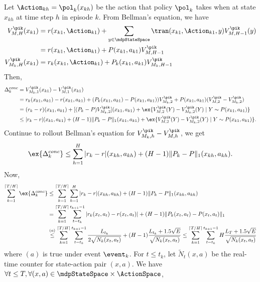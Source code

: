 Let $\Action_{kh}=\pol_{k}(x_{kh})$ be the action that policy $\pol_k$ takes when at state $x_{kh}$ at time step $h$ in episode $k$. From Bellman's equation, we have
\begin{align*}
V^{\pik}_{M,H}(x_{k1})
&= r(x_{k1},\Action_{k1}) +\sum_{y\in\mdpStateSpace}\tran(x_{k1},\Action_{k1},y)V^{\pik}_{M,H-1}(y) \\
&= r(x_{k1},\Action_{k1}) +P(x_{k1},a_{k1})V^{\pik}_{M,H-1} \\
V^{\pik}_{M_k,H}(x_{k1}) &= r_k(x_{k1},\Action_{k1}) +P_k(x_{k1},a_{k1})V^{\pik}_{M_k,H-1}
\end{align*}
Then,
\begin{align*}
\Delta_k^{conc}
    &= V^{\pik}_{M_k,1}(x_{k1}) -V^{\pik}_{M,1}(x_{k1}) \\
    &= r_k(x_{k1},a_{k1})-r(x_{k1},a_{k1}) +(P_k(x_{k1},a_{k1}) -P(x_{k1},a_{k1}))V^{\pik}_{M_k,2} +P(x_{k1},a_{k1})(V^{\pik}_{M,2}-V^{\pik}_{M_k,2}) \\
    &= (r_k-r)(x_{k1},a_{k1}) +[(P_k -P)V^{\pik}_{M_k,2}](x_{k1},a_{k1}) +\ex{V^{\pik}_{M,2}(Y)-V^{\pik}_{M_k,2}(Y) \mid Y\sim P(x_{k1},a_{k1})} \\
    &\le \vert r_k-r\vert(x_{k1},a_{k1}) +(H-1)\Vert P_k -P\Vert_1(x_{k1},a_{k1}) +\ex{V^{\pik}_{M,2}(Y)-V^{\pik}_{M_k,2}(Y) \mid Y\sim P(x_{k1},a_{k1})}.
\end{align*}
Continue to rollout Bellman's equation for $V^{\pik}_{M_k,h}-V^{\pik}_{M,h}$, we get
\begin{align*}
\ex{\Delta_k^{conc}} \le \sum_{h=1}^{H}\vert r_k-r\vert(x_{kh},a_{kh}) +(H-1)\Vert P_k -P\Vert_1(x_{kh},a_{kh}).
\end{align*}
Now,
\begin{align*}
\sum_{k=1}^{\lceil T/H\rceil}\ex{\Delta_k^{conc}}
&\le \sum_{k=1}^{\lceil T/H\rceil} \sum_{h=1}^{H}\vert r_k-r\vert(x_{kh},a_{kh}) +(H-1)\Vert P_k -P\Vert_1(x_{kh},a_{kh}) \\
&=\sum_{k=1}^{\lceil T/H\rceil} \sum_{t=t_k}^{t_{k+1}-1}\vert r_k(x_t,a_t)-r(x_t,a_t)\vert +(H-1)\Vert P_k(x_t,a_t) -P(x_t,a_t)\Vert_1 \\
&\overset{(a)}\le \sum_{k=1}^{\lceil T/H\rceil} \sum_{t=t_k}^{t_{k+1}-1} \frac{L_{t_k}}{2\sqrt{N_k(x_t,a_t)}} +(H-1)\frac{L_{t_k}+1.5\sqrt{E}}{\sqrt{N_k(x_t,a_t)}} \le\sum_{k=1}^{\lceil T/H\rceil} \sum_{t=t_k}^{t_{k+1}-1}H\frac{L_T+1.5\sqrt{E}}{\sqrt{N_k(x_t,a_t)}}
\end{align*}
where $(a)$ is true under event $\event_k$.
For $t\le t_k$, let $\tilde{N}_t(x,a)$ be the real-time counter for state-action pair $(x,a)$. We have $\forall t\le T, \forall (x,a)\in \mdpStateSpace\times\ActionSpace$,


